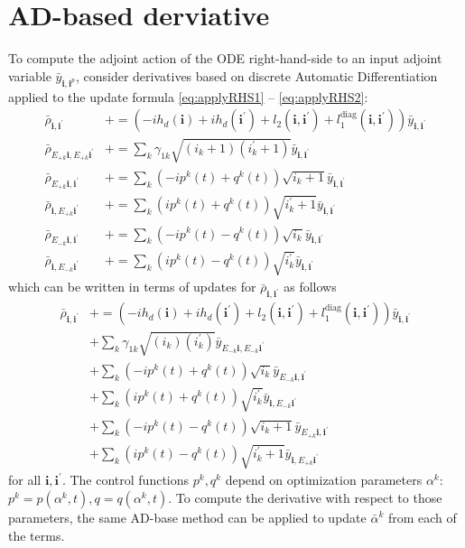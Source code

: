 \documentclass[letterpaper]{article}
\newcommand{\bfi}{\boldsymbol{i}}
\newcommand{\p}{\prime}
\newcommand{\Epk}{E_{+k}}
\newcommand{\Emk}{E_{-k}}
\newcommand{\pluseq}{\mathrel{+}=}
\begin{document}
\section{AD-based derviative}
To compute the adjoint action of the ODE right-hand-side to an input adjoint variable $\bar y_{\bfi, \bfi^p}$, consider derivatives based on discrete Automatic Differentiation applied to the update formula \eqref{eq:applyRHS1} -- \eqref{eq:applyRHS2}:
\begin{align} 
       \bar \rho_{\bfi, \bfi^\p} &\pluseq \left(-i h_d(\bfi) + ih_d(\bfi^\prime)
        + l_2(\bfi,\bfi^\prime) + l_1^{\text{diag}}(\bfi, \bfi^\prime) \right) \bar y_{\bfi,\bfi^\prime} \\
        \bar \rho_{E_{+k}\bfi, E_{+k}\bfi^\prime} &\pluseq \sum_k \gamma_{1k} \sqrt{(i_k+1)(i_k^\prime+1)} \bar y_{\bfi, \bfi^\p} \\
        \bar \rho_{\Epk \bfi, \bfi^\prime} &\pluseq \sum_k \left(-ip^k(t) + q^k(t)\right) \sqrt{i_k+1} \bar y_{\bfi, \bfi^\p} \\
        \bar \rho_{\bfi,\Epk \bfi^\prime} &\pluseq \sum_k \left( ip^k(t) + q^k(t)\right) \sqrt{i_k^\prime+1} \bar y_{\bfi, \bfi^\p} \\
        \bar \rho_{\Emk \bfi, \bfi^\prime} &\pluseq \sum_k \left(-ip^k(t) - q^k(t)\right) \sqrt{i_k} \bar y_{\bfi, \bfi^\p} \\
        \bar \rho_{\bfi,\Emk \bfi^\prime} &\pluseq \sum_k \left( ip^k(t) - q^k(t)\right) \sqrt{i_k^\prime} \bar y_{\bfi, \bfi^\p}
  \end{align}
which can be written in terms of updates for $\bar \rho_{\bfi, \bfi^\p}$ as follows
\begin{align} 
       \bar \rho_{\bfi, \bfi^\p} &\pluseq \left(-i h_d(\bfi) + ih_d(\bfi^\prime)
        + l_2(\bfi,\bfi^\prime) + l_1^{\text{diag}}(\bfi, \bfi^\prime) \right) \bar y_{\bfi,\bfi^\prime} \\
         &+ \sum_k \gamma_{1k} \sqrt{(i_k)(i_k^\prime)} \bar y_{E_{-k}\bfi, E_{-k}\bfi^\p} \\
         &+ \sum_k \left(-ip^k(t) + q^k(t)\right) \sqrt{i_k} \bar y_{\Emk\bfi, \bfi^\p} \\
         &+ \sum_k \left( ip^k(t) + q^k(t)\right) \sqrt{i_k^\prime} \bar y_{\bfi, \Emk \bfi^\p} \\
         &+ \sum_k \left(-ip^k(t) - q^k(t)\right) \sqrt{i_k+1} \bar y_{\Epk \bfi, \bfi^\p} \\
         &+ \sum_k \left( ip^k(t) - q^k(t)\right) \sqrt{i_k^\prime+1} \bar y_{\bfi, \Epk\bfi^\p}
  \end{align}
for all $\bfi, \bfi^\p$.
The control functions $p^k, q^k$ depend on optimization parameters $\alpha^k$: $p^k = p(\alpha^k,t), q = q(\alpha^k,t)$. To compute the derivative with respect to those parameters, the same AD-base method can be applied to update $\bar \alpha^k$ from each of the terms.
\end{document}
